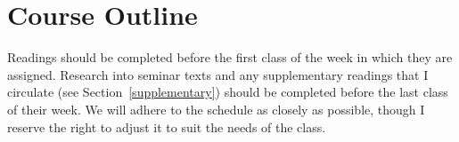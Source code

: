 \documentclass[titlepage]{article}
\begin{document}
\section{Course Outline}
\label{outline}

Readings should be completed before the first class of the week in which
they are assigned. Research into seminar texts and any supplementary
readings that I circulate (see Section~\ref{supplementary}) should be
completed before the last class of their week. We will adhere to the
schedule as closely as possible, though I reserve the right to adjust it
to suit the needs of the class.

\newcommand\Yhwh{\textsc{Yhwh}}
\newcommand\rarr{\char"2192\hspace*{0.5pt}}

\end{document}
